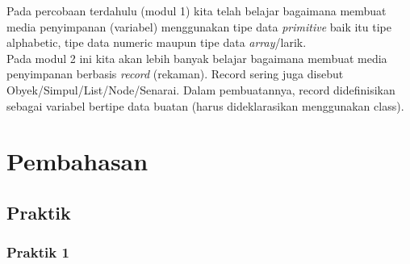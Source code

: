 \documentclass[a4paper,12pt]{article}
\begin{document}
Pada percobaan terdahulu (modul 1) kita telah belajar bagaimana membuat media penyimpanan (variabel) menggunakan
tipe data \textit{primitive} baik itu tipe alphabetic, tipe data numeric maupun tipe data \textit{array}/larik.\\

Pada modul 2 ini kita akan lebih banyak belajar bagaimana membuat media penyimpanan berbasis \textit{record}
(rekaman). Record sering juga disebut Obyek/Simpul/List/Node/Senarai. Dalam pembuatannya, record didefinisikan sebagai
variabel bertipe data buatan (harus dideklarasikan menggunakan class).

\newpage

\section{Pembahasan}
\subsection{Praktik}
\subsubsection{Praktik 1}
\end{document}
